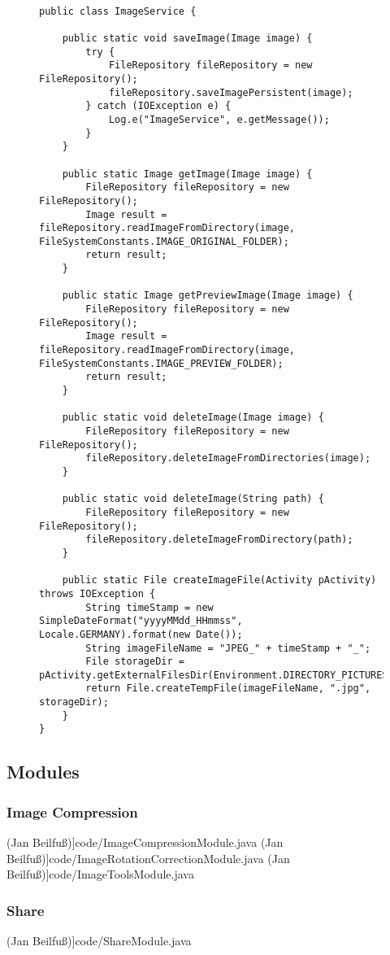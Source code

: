 \begin{figure}[H]
\begin{lstlisting}[caption=ImageService (Ruthild Gilles)]

public class ImageService {

    public static void saveImage(Image image) {
        try {
            FileRepository fileRepository = new FileRepository();
            fileRepository.saveImagePersistent(image);
        } catch (IOException e) {
            Log.e("ImageService", e.getMessage());
        }
    }

    public static Image getImage(Image image) {
        FileRepository fileRepository = new FileRepository();
        Image result = fileRepository.readImageFromDirectory(image, FileSystemConstants.IMAGE_ORIGINAL_FOLDER);
        return result;
    }

    public static Image getPreviewImage(Image image) {
        FileRepository fileRepository = new FileRepository();
        Image result = fileRepository.readImageFromDirectory(image, FileSystemConstants.IMAGE_PREVIEW_FOLDER);
        return result;
    }

    public static void deleteImage(Image image) {
        FileRepository fileRepository = new FileRepository();
        fileRepository.deleteImageFromDirectories(image);
    }

    public static void deleteImage(String path) {
        FileRepository fileRepository = new FileRepository();
        fileRepository.deleteImageFromDirectory(path);
    }

    public static File createImageFile(Activity pActivity) throws IOException {
        String timeStamp = new SimpleDateFormat("yyyyMMdd_HHmmss", Locale.GERMANY).format(new Date());
        String imageFileName = "JPEG_" + timeStamp + "_";
        File storageDir = pActivity.getExternalFilesDir(Environment.DIRECTORY_PICTURES);
        return File.createTempFile(imageFileName, ".jpg", storageDir);
    }
}
\end{lstlisting}
\end{figure}

\subsection{Modules}
	\subsubsection{Image Compression}
 (Jan Beilfuß)]{code/ImageCompressionModule.java}
 (Jan Beilfuß)]{code/ImageRotationCorrectionModule.java}
 (Jan Beilfuß)]{code/ImageToolsModule.java}
	\subsubsection{Share}
 (Jan Beilfuß)]{code/ShareModule.java}


